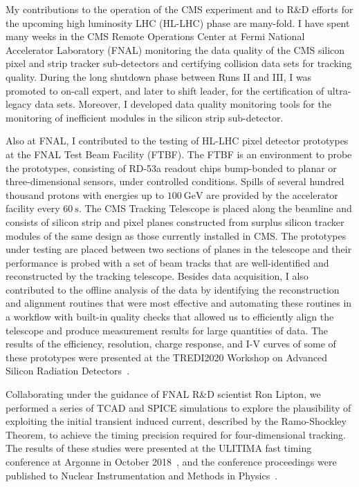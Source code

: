 My contributions to the operation of the CMS experiment and to R\&D efforts for the upcoming high luminosity LHC (HL-LHC) phase are many-fold.
I have spent many weeks in the CMS Remote Operations Center at Fermi National Accelerator Laboratory (FNAL) monitoring the data quality of the CMS silicon pixel and strip tracker sub-detectors and certifying collision data sets for tracking quality.
During the long shutdown phase between Runs II and III, I was promoted to on-call expert, and later to shift leader, for the certification of ultra-legacy data sets.
Moreover, I developed data quality monitoring tools for the monitoring of inefficient modules in the silicon strip sub-detector.

Also at FNAL, I contributed to the testing of HL-LHC pixel detector prototypes at the FNAL Test Beam Facility (FTBF).
The FTBF is an environment to probe the prototypes, consisting of RD-53a readout chips bump-bonded to planar or three-dimensional sensors, under controlled conditions.
Spills of several hundred thousand protons with energies up to $\SI{100}{\GeV}$ are provided by the accelerator facility every $\SI{60}{\s}$.
The CMS Tracking Telescope is placed along the beamline and consists of silicon strip and pixel planes constructed from surplus silicon tracker modules of the same design as those currently installed in CMS.
The prototypes under testing are placed between two sections of planes in the telescope and their performance is probed with a set of beam tracks that are well-identified and reconstructed by the tracking telescope.
Besides data acquisition, I also contributed to the offline analysis of the data by identifying the reconstruction and alignment routines that were most effective and automating these routines in a workflow with built-in quality checks that allowed us to efficiently align the telescope and produce measurement results for large quantities of data.
The results of the efficiency, resolution, charge response, and I-V curves of some of these prototypes were presented at the TREDI2020 Workshop on Advanced Silicon Radiation Detectors~\cite{TREDI2020}.

Collaborating under the guidance of FNAL R\&D scientist Ron Lipton, we performed a series of TCAD and SPICE simulations to explore the plausibility of exploiting the initial transient induced current, described by the Ramo-Shockley Theorem, to achieve the timing precision required for four-dimensional tracking.
The results of these studies were presented at the ULITIMA fast timing conference at Argonne in October 2018~\cite{ULITIMA2018}, and the conference proceedings were published to Nuclear Instrumentation and Methods in Physics~\cite{LIPTON2019162423}.

